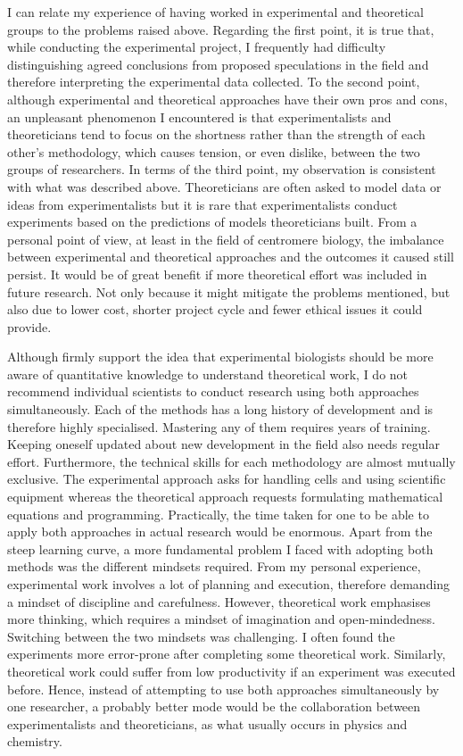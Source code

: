 I can relate my experience of having worked in experimental and theoretical groups to the problems \cite{Fidelman1985TheModeling} raised above. Regarding the first point, it is true that, while conducting the experimental project, I frequently had difficulty distinguishing agreed conclusions from proposed speculations in the field and therefore interpreting the experimental data collected. To the second point, although experimental and theoretical approaches have their own pros and cons, an unpleasant phenomenon I encountered is that experimentalists and theoreticians tend to focus on the shortness rather than the strength of each other's methodology, which causes tension, or even dislike, between the two groups of researchers. In terms of the third point, my observation is consistent with what was described above. Theoreticians are often asked to model data or ideas from experimentalists but it is rare that experimentalists conduct experiments based on the predictions of models theoreticians built. From a personal point of view, at least in the field of centromere biology, the imbalance between experimental and theoretical approaches and the outcomes it caused still persist. It would be of great benefit if more theoretical effort was included in future research. Not only because it might mitigate the problems mentioned, but also due to lower cost, shorter project cycle and fewer ethical issues it could provide. 

Although firmly support the idea that experimental biologists should be more aware of quantitative knowledge to understand theoretical work, I do not recommend individual scientists to conduct research using both approaches simultaneously. Each of the methods has a long history of development and is therefore highly specialised. Mastering any of them requires years of training. Keeping oneself updated about new development in the field also needs regular effort. Furthermore, the technical skills for each methodology are almost mutually exclusive. The experimental approach asks for handling cells and using scientific equipment whereas the theoretical approach requests formulating mathematical equations and programming. Practically, the time taken for one to be able to apply both approaches in actual research would be enormous. Apart from the steep learning curve, a more fundamental problem I faced with adopting both methods was the different mindsets required. From my personal experience, experimental work involves a lot of planning and execution, therefore demanding a mindset of discipline and carefulness. However, theoretical work emphasises more thinking, which requires a mindset of imagination and open-mindedness. Switching between the two mindsets was challenging. I often found the experiments more error-prone after completing some theoretical work. Similarly, theoretical work could suffer from low productivity if an experiment was executed before. Hence, instead of attempting to use both approaches simultaneously by one researcher, a probably better mode would be the collaboration between experimentalists and theoreticians, as what usually occurs in physics and chemistry. 





